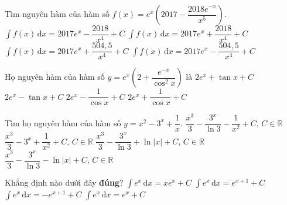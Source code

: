 \begin{ex}%
Tìm nguyên hàm của hàm số $f(x)=e^x\left(2017-\dfrac{2018e^{-x}}{x^5}\right) $.
\choice
{$\displaystyle\int f(x) \mathrm{\,d}x=2017e^x-\dfrac{2018}{x^4}+C$}
{$\displaystyle\int f(x) \mathrm{\,d}x=2017e^x+\dfrac{2018}{x^4}+C$}
{\True $\displaystyle\int f(x) \mathrm{\,d}x=2017e^x+\dfrac{504{,}5}{x^4}+C$}
{$\displaystyle\int f(x) \mathrm{\,d}x=2017e^x-\dfrac{504{,}5}{x^4}+C$}
\end{ex}

\begin{ex}%
Họ nguyên hàm của hàm số $y=e^x\left(2+\dfrac{e^{-x}}{\cos^2x}\right) $ là
\choice
{\True $2e^x+\tan x+C$}
{$2e^x-\tan x+C$}
{$2e^x-\dfrac{1}{\cos x}+C$}
{$2e^x+\dfrac{1}{\cos x}+C$}
\end{ex}

\begin{ex}%
Tìm họ nguyên hàm của hàm số $y=x^2-3^x+\dfrac{1}{x}$.
\choice
{$\dfrac{x^3}{3}-\dfrac{3^x}{\ln 3}-\dfrac{1}{x^2}+C,\,C\in \mathbb{R}$}
{$\dfrac{x^3}{3}-3^x+\dfrac{1}{x^2}+C,\,C\in \mathbb{R}$}
{\True $\dfrac{x^3}{3}-\dfrac{3^x}{\ln 3}+\ln\left|x\right|+C,\,C\in \mathbb{R}$}
{$\dfrac{x^3}{3}-\dfrac{3^x}{\ln 3}-\ln\left|x\right|+C,\,C\in \mathbb{R}$}
\end{ex}

\begin{ex}%
Khẳng định nào dưới đây \textbf{đúng}?
\choice
{$\displaystyle\int e^x \mathrm{\,d}x=xe^x+C$}
{$\displaystyle\int e^x \mathrm{\,d}x=e^{x+1}+C$}
{$\displaystyle\int e^x \mathrm{\,d}x=-e^{x+1}+C$}
{\True $\displaystyle\int e^x \mathrm{\,d}x=e^x+C$}
\end{ex}

